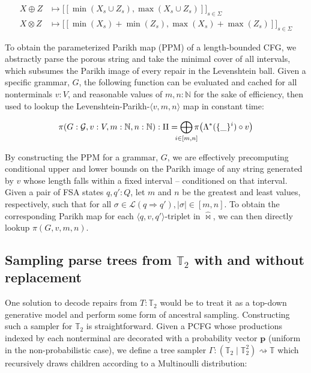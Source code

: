 \documentclass[sigplan,acmsmall,nonacm,screen]{acmart}\settopmatter{printfolios=false,printccs=false,printacmref=false}
\begin{document}
  \begin{align}
      X \oplus Z &\mapsto \big[[\min(X_s \cup Z_s), \max(X_s \cup Z_s)]\big]_{s \in \Sigma}\\ X \otimes Z &\mapsto \big[[\min(X_s) + \min(Z_s), \max(X_s) + \max(Z_s)]\big]_{s \in \Sigma}
  \end{align}

  To obtain the parameterized Parikh map (PPM) of a length-bounded CFG, we abstractly parse the porous string and take the minimal cover of all intervals, which subsumes the Parikh image of every repair in the Levenshtein ball. Given a specific grammar, $G$, the following function can be evaluated and cached for all nonterminals $v: V$, and reasonable values of $m, n: \mathbb{N}$ for the sake of efficiency, then used to lookup the Levenshtein-Parikh-$\langle v, m, n\rangle $ map in constant time:

  \begin{equation}
  \pi(G: \mathcal{G}, v: V, m: \mathbb{N}, n: \mathbb{N}): \Pi = \bigoplus_{\mathclap{i\in [m, n]}}\pi\bigl(\Lambda^*(\{\_\}^i)\circ v\bigr)
  \end{equation}

  By constructing the PPM for a grammar, $G$, we are effectively precomputing conditional upper and lower bounds on the Parikh image of any string generated by $v$ whose length falls within a fixed interval -- conditioned on that interval. Given a pair of FSA states $q, q': Q$, let $m$ and $n$ be the greatest and least values, respectively, such that for all $\sigma \in \mathcal{L}(q \Longrightarrow q'), |\sigma|\in[m, n]$. To obtain the corresponding Parikh map for each $\langle q, v, q'\rangle$-triplet in $\hat\Join$, we can then directly lookup $\pi(G, v, m, n)$.

\subsection{Sampling parse trees from $\mathbb{T}_2$ with and without replacement}\label{sec:tree_sampling}

  One solution to decode repairs from $T: \mathbb{T}_2$ would be to treat it as a top-down generative model and perform some form of ancestral sampling. Constructing such a sampler for $\mathbb{T}_2$ is straightforward. Given a PCFG whose productions indexed by each nonterminal are decorated with a probability vector $\mathbf{p}$ (uniform in the non-probabilistic case), we define a tree sampler $\Gamma: (\mathbb{T}_2 \mid \mathbb{T}_2^2) \rightsquigarrow \mathbb{T}$ which recursively draws children according to a Multinoulli distribution:
\end{document}
